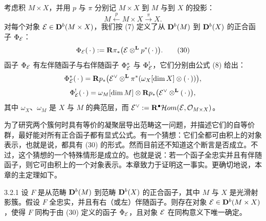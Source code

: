 考虑积 $M\times X$，并用 $p$ 与 $\pi$ 分别记 $M\times X$ 到 $M$ 与到 $X$ 的投影：
\begin{equation*}
M\xleftarrow{\ p\ }M\times X\xrightarrow{\ \pi\ }X.
\end{equation*}
对每个对象 $\mathcal{E}\in\mathbf{D}^{b}(M\times X)$，我们按 (7) 定义了从 $\mathbf{D}^{b}(M)$ 到 $\mathbf{D}^{b}(X)$ 的正合函子 $\Phi_{\mathcal{E}}$：
\begin{equation}
\Phi_{\mathcal{E}}(\,\cdot\,):=\mathbf{R}\pi_{*}\bigl(\mathcal{E}\otimes^{\mathbf{L}} p^{*}(\,\cdot\,)\bigr).
\tag{30}
\end{equation}
函子 $\Phi_{\mathcal{E}}$ 有左伴随函子与右伴随函子 $\Phi^{*}_{\mathcal{E}}$ 与 $\Phi^{!}_{\mathcal{E}}$，它们分别由公式 (8) 给出：
\begin{equation*}
\Phi^{*}_{\mathcal{E}}(\,\cdot\,)
=\mathbf{R} p_{*}\bigl(\mathcal{E}^{\vee}\otimes^{\mathbf{L}}\pi^{*}(\omega_{X}[\dim X]\otimes(\,\cdot\,))\bigr),
\end{equation*}
\begin{equation*}
\Phi^{!}_{\mathcal{E}}(\,\cdot\,)
=\omega_{M}[\dim M]\otimes\mathbf{R} p_{*}\bigl(\mathcal{E}^{\vee}\otimes^{\mathbf{L}}(\,\cdot\,)\bigr),
\end{equation*}
其中 $\omega_{X}$、$\omega_{M}$ 是 $X$ 与 $M$ 的典范层，而 $\mathcal{E}^{\vee}:=\mathbf{R}^{\bullet}\mathcal{H}om(\mathcal{E},\mathcal{O}_{M\times X})$。



为了研究两个簇何时具有等价的凝聚层导出范畴这一问题，并描述它们的自等价群，最好能对所有正合函子都有显式公式。有一个猜想：它们全都可由积上的对象表示，也就是说，都具有 (30) 的形式。然而目前还不知道这个断言是否成立。不过，这个猜想的一个特殊情形是成立的。也就是说：若一个函子全忠实并且有伴随函子，则它可由积上的一个对象表示。本章致力于证明这一事实。更确切地说，本章的主定理如下。

\begin{theorem}{3.2.1}
设 $F$ 是从范畴 $\mathbf{D}^{b}(M)$ 到范畴 $\mathbf{D}^{b}(X)$ 的正合函子，其中 $M$ 与 $X$ 是光滑射影簇。假设 $F$ 全忠实，并且有右（或左）伴随函子。则存在对象 $\mathcal{E}\in\mathbf{D}^{b}(M\times X)$，使得 $F$ 同构于由 (30) 定义的函子 $\Phi_{\mathcal{E}}$，且对象 $\mathcal{E}$ 在同构意义下唯一确定。
\end{theorem}

